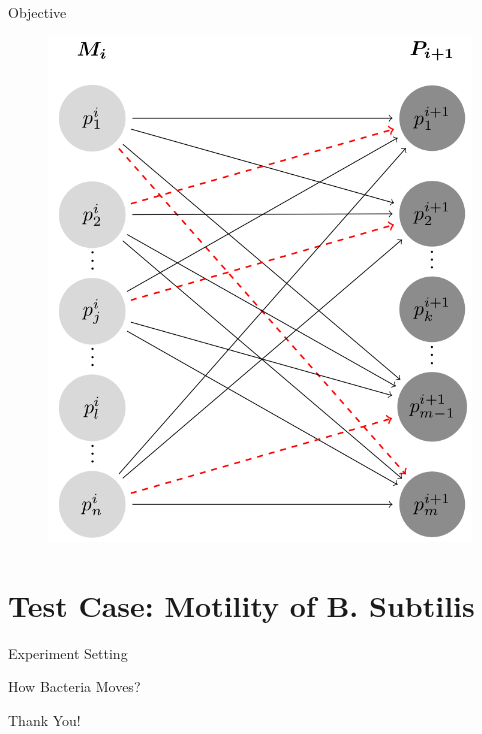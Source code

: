 \documentclass{beamer}
\begin{document}
		\begin{frame}{Objective}
	
		\begin{figure}
					\centering
					\includegraphics[scale=0.18]{./images/graph.png}
				\end{figure}
			
			
			
		\end{frame}

	


\section{Test Case: Motility of B. Subtilis}
	\begin{frame}{Experiment Setting}

	\end{frame}
	\begin{frame}{How Bacteria Moves?}

	\end{frame}




\begin{frame}%
\begin{center}
{\fontsize{40}{50}\selectfont Thank You!}
\end{center}
\end{frame}
\end{document}
